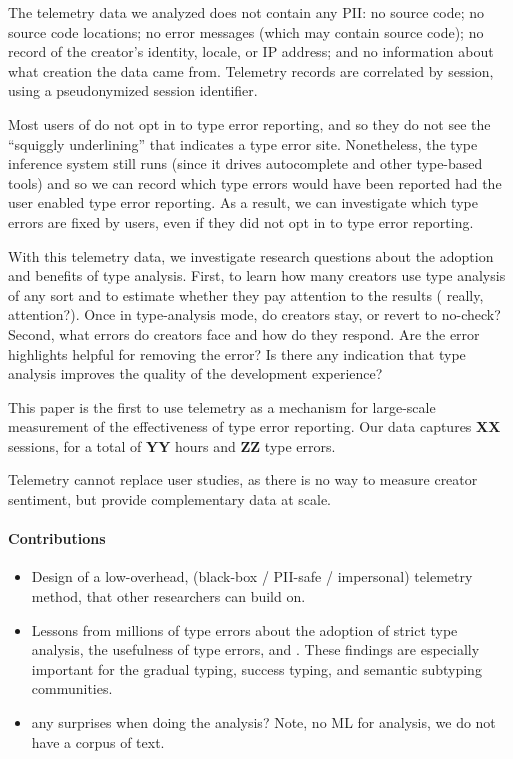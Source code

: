 \documentclass[
  acmsmall,
  review,
]{acmart}
\begin{document}
The telemetry data we analyzed does not contain any PII:
no source code;
no source code locations;
no error messages (which may contain source code);
no record of the creator's identity, locale, or IP address;
and no information about what creation the data came from.
Telemetry records are correlated by session, using a pseudonymized
session identifier.

Most users of  do not opt in to type error
reporting, and so they do not see the ``squiggly underlining'' that
indicates a type error site. Nonetheless, the type inference system
still runs (since it drives autocomplete and other type-based tools) and
so we can record which type errors would have been reported had the
user enabled type error reporting. As a result, we can investigate
which type errors are  fixed by users, even if they did not opt in to
type error reporting.

With this telemetry data, we investigate research questions about
the adoption and benefits of type analysis.
First, to learn how many creators use type analysis of any sort
and to estimate whether they pay attention to the results (\FILL{} really, attention?).
Once in type-analysis mode, do creators stay, or revert to no-check?
Second, what errors do creators face and how do they respond.
Are the error highlights helpful for removing the error?
Is there any indication that type analysis improves the quality of the development experience?

This paper is the first to use telemetry as a mechanism for
large-scale measurement of the effectiveness of type error reporting.
Our data captures \textbf{XX} sessions, for a total of \textbf{YY}
hours and \textbf{ZZ} type errors.

Telemetry cannot replace user studies, as there is no way to measure
creator sentiment, but provide complementary data at scale.

\paragraph{Contributions}
\begin{itemize}
  \item
    Design of a low-overhead, (black-box / PII-safe / impersonal)
    telemetry method, that other
    researchers can build on.

  \item
    Lessons from millions of type errors about
    the adoption of strict type analysis,
    the usefulness of type errors,
    and \FILL{}.
    These findings are especially important for the
    gradual typing, success typing, and semantic subtyping communities.

  \item
    \FILL{} any surprises when doing the analysis?
    Note, no ML for analysis, we do not have a corpus of text.

\end{itemize}
\end{document}
